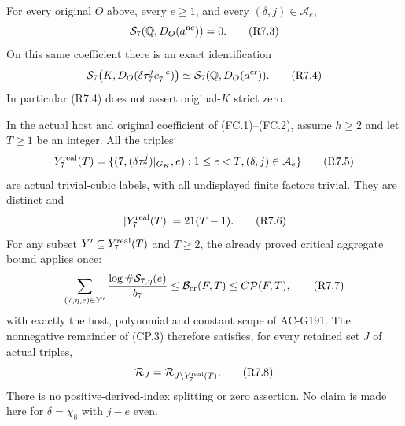 \begin{theorem}
\label{AC-G197}
For every original $O$ above, every $e\geq1$, and every
$(\delta,j)\in\mathcal A_e$,
\[
             \mathcal S_7(\mathbb Q,D_O(a^{\rm nc}))=0.
 \tag{R7.3}
\]
On this same coefficient there is an exact identification
\[
 \mathcal S_7\bigl(K,D_O(\delta\tau_7^j c_7^{-e})\bigr)
       \simeq \mathcal S_7(\mathbb Q,D_O(a^{\rm cr})).
 \tag{R7.4}
\]
In particular (R7.4) does not assert original-$K$ strict zero.

In the actual host and original coefficient of (FC.1)--(FC.2),
assume $h\geq2$ and let $T\geq1$ be an integer. All the triples
\[
 Y^{\rm real}_7(T)=
 \{(7,(\delta\tau_7^j)|_{G_K},e):1\leq e<T,
                                      (\delta,j)\in\mathcal A_e\}
 \tag{R7.5}
\]
are actual trivial-cubic labels, with all undisplayed finite
factors trivial. They are distinct and
\[
                        |Y^{\rm real}_7(T)|=21(T-1).
 \tag{R7.6}
\]
For any subset $Y'\subseteq Y^{\rm real}_7(T)$ and $T\geq2$,
the already proved critical aggregate bound applies once:
\[
 \sum_{(7,\eta,e)\in Y'}
       \frac{\log\#\mathcal S_{7,\eta}(e)}{b_7}
       \leq\mathcal B_{\rm cr}(F,T)\leq C\mathcal P(F,T),
 \tag{R7.7}
\]
with exactly the host, polynomial and constant scope of AC-G191.
The nonnegative remainder of (CP.3) therefore satisfies, for every
retained set $J$ of actual triples,
\[
             \mathcal R_J=
                    \mathcal R_{J\setminus Y^{\rm real}_7(T)}.
 \tag{R7.8}
\]
There is no positive-derived-index splitting or zero assertion.
No claim is made here for $\delta=\chi_8$ with $j-e$ even.
\end{theorem}

